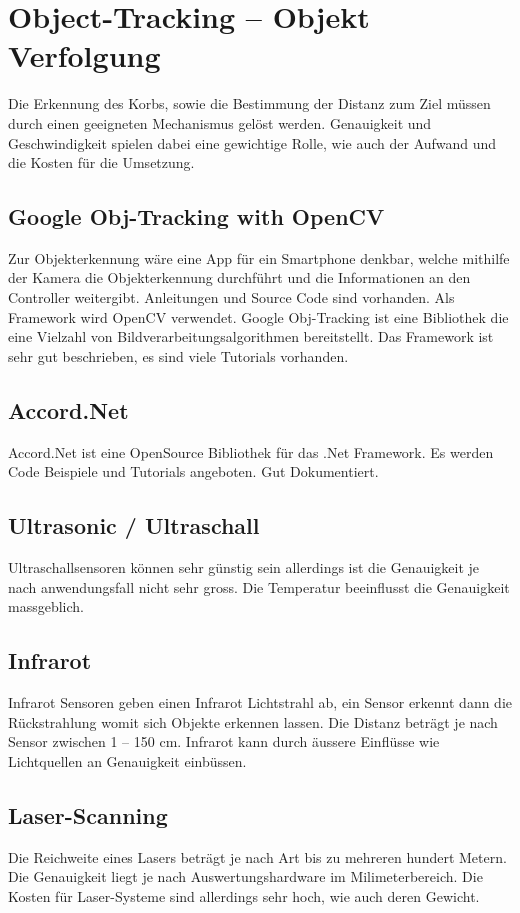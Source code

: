 ﻿\section{Object-Tracking – Objekt Verfolgung}
Die Erkennung des Korbs, sowie die Bestimmung der Distanz zum Ziel müssen durch einen geeigneten Mechanismus gelöst werden. Genauigkeit und Geschwindigkeit spielen dabei eine gewichtige Rolle, wie auch der Aufwand und die Kosten für die Umsetzung.

\subsection{Google Obj-Tracking with OpenCV}
Zur Objekterkennung wäre eine App für ein Smartphone denkbar, welche mithilfe der Kamera die Objekterkennung durchführt und die Informationen an den Controller weitergibt. Anleitungen und Source Code sind vorhanden. Als Framework wird OpenCV verwendet. Google Obj-Tracking ist eine Bibliothek die eine Vielzahl von Bildverarbeitungsalgorithmen bereitstellt. Das Framework ist sehr gut beschrieben, es sind viele Tutorials vorhanden.

\subsection{Accord.Net}
Accord.Net ist eine OpenSource Bibliothek für das .Net Framework. Es werden Code Beispiele und Tutorials angeboten. Gut Dokumentiert.

\subsection{Ultrasonic / Ultraschall }
Ultraschallsensoren können sehr günstig sein allerdings ist die Genauigkeit je nach anwendungsfall nicht sehr gross. Die Temperatur beeinflusst die Genauigkeit massgeblich. 

\subsection{Infrarot}
Infrarot Sensoren geben einen Infrarot Lichtstrahl ab, ein Sensor erkennt dann die Rückstrahlung womit sich Objekte erkennen lassen. Die Distanz beträgt je nach Sensor zwischen 1 – 150 cm. Infrarot kann durch äussere Einflüsse wie Lichtquellen an Genauigkeit einbüssen.

\subsection{Laser-Scanning}
Die Reichweite eines Lasers beträgt je nach Art bis zu mehreren hundert Metern. Die Genauigkeit liegt je nach Auswertungshardware im Milimeterbereich. Die Kosten für Laser-Systeme sind allerdings sehr hoch, wie auch deren Gewicht.

